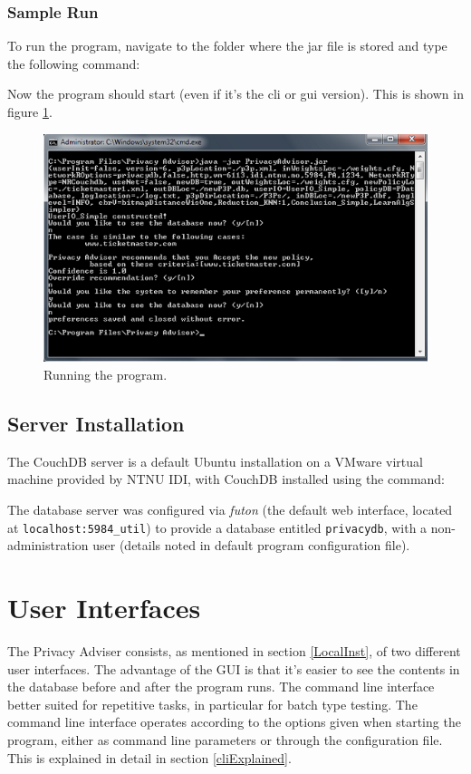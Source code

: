 \subsubsection{Sample Run}
To run the program, navigate to the folder where the jar file is stored and type the following command:


Now the program should start (even if it's the cli or gui version). This is shown in figure \ref{runProgram}.

\begin{figure}
  \begin{centering}
    \includegraphics{Documentation/cli.png}
    \caption{Running the program.}
    \label{runProgram}
  \end{centering}
\end{figure}


\subsection{Server Installation}
The CouchDB server is a default Ubuntu installation on a VMware virtual machine provided by NTNU IDI, with CouchDB installed using the command:


The database server was configured via \emph{futon} (the default web interface, located at \texttt{localhost:5984\/\_util}) to provide a database entitled \texttt{privacydb}, with a non-administration user (details noted in default program configuration file).

\section{User Interfaces}
The Privacy Adviser consists, as mentioned in section \ref{LocalInst}, of two different user interfaces. The advantage of the GUI is that it's easier to see the contents in the database before and after the program runs. The command line interface better suited for repetitive tasks, in particular for batch type testing. The command line interface operates according to the options given when starting the program, either as command line parameters or through the configuration file. This is explained in detail in section \ref{cliExplained}.

